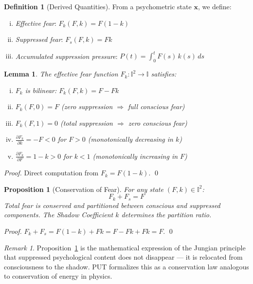 \documentclass[12pt,a4paper]{article}
\theoremstyle{plain}
\newtheorem{proposition}[theorem]{Proposition}
\newtheorem{lemma}[theorem]{Lemma}
\theoremstyle{definition}
\newtheorem{definition}[theorem]{Definition}
\theoremstyle{remark}
\newtheorem{remark}[theorem]{Remark}
\newcommand{\I}{\mathbb{I}}
\newcommand{\Fk}{F_k}
\newcommand{\Fs}{F_s}
\begin{document}
\begin{definition}[Derived Quantities]
From a psychometric state $\mathbf{x}$, we define:
\begin{enumerate}[(i),nosep]
  \item \emph{Effective fear}: $\Fk(F,k) = F(1-k)$
  \item \emph{Suppressed fear}: $\Fs(F,k) = Fk$
  \item \emph{Accumulated suppression pressure}: $P(t) = \int_0^t F(s)\,k(s)\,ds$
\end{enumerate}
\end{definition}

\begin{lemma}
The effective fear function $\Fk: \I^2 \to \I$ satisfies:
\begin{enumerate}[(i),nosep]
  \item $\Fk$ is bilinear: $\Fk(F,k) = F - Fk$
  \item $\Fk(F,0) = F$ \quad (zero suppression $\Rightarrow$ full conscious fear)
  \item $\Fk(F,1) = 0$ \quad (total suppression $\Rightarrow$ zero conscious fear)
  \item $\frac{\partial \Fk}{\partial k} = -F < 0$ for $F > 0$ \quad (monotonically decreasing in $k$)
  \item $\frac{\partial \Fk}{\partial F} = 1-k > 0$ for $k < 1$ \quad (monotonically increasing in $F$)
\end{enumerate}
\end{lemma}

\begin{proof}
Direct computation from $\Fk = F(1-k)$. \qed
\end{proof}

\begin{proposition}[Conservation of Fear]\label{prop:conservation}
For any state $(F,k) \in \I^2$:
\[
\Fk + \Fs = F
\]
Total fear is conserved and partitioned between conscious and suppressed components. The Shadow Coefficient $k$ determines the partition ratio.
\end{proposition}

\begin{proof}
$\Fk + \Fs = F(1-k) + Fk = F - Fk + Fk = F$. \qed
\end{proof}

\begin{remark}
Proposition~\ref{prop:conservation} is the mathematical expression of the Jungian principle that suppressed psychological content does not disappear --- it is relocated from consciousness to the shadow. PUT formalizes this as a conservation law analogous to conservation of energy in physics.
\end{remark}
\end{document}
